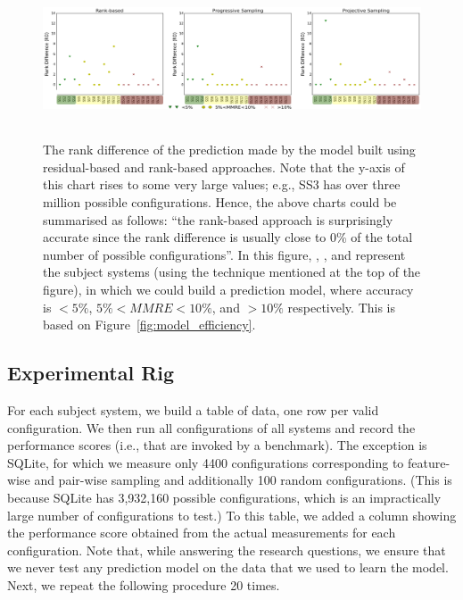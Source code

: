 \begin{figure}[tbh]
\centering
\includegraphics[width=0.8\paperwidth, height=4.7cm]{Figures/figure4_2_mod}
\caption{
    \small{The rank difference of the prediction made by the model built using residual-based and rank-based approaches. Note that the y-axis of this chart rises to some very large values; e.g., SS3 has over three million
    possible configurations. Hence, the above charts could be summarised as follows: ``the rank-based approach is surprisingly accurate since the rank difference is usually close to 0\% of the total number of possible configurations''. In this figure, \protect\custriangle{}, \protect\cusdot{}, and \protect\cuscross{} represent the subject systems (using the technique mentioned at the top of the figure), in which we could build a prediction model, where accuracy is  $< 5\%$, $5\%<MMRE<10\%$, and $>10\%$ respectively. This is based on Figure~\ref{fig:model_efficiency}.
    }
}\label{fig:rankdiff}
\end{figure}



\subsection{Experimental Rig}
For each subject system, we build a table of data, one row per valid configuration. We then run all configurations of all systems and record the performance scores (i.e., that are invoked by a benchmark). The exception is SQLite, for which we measure only 4400 configurations corresponding to feature-wise and pair-wise sampling and additionally 100 random configurations. (This is because SQLite has 3,932,160 possible configurations,
which is an impractically large number of configurations to test.) To this table, we added a column showing the performance score obtained from the actual measurements for each configuration. Note that, while answering the research questions, we ensure that we never test any prediction model on the data that we used to learn the model. Next, we repeat the following procedure 20 times. 

